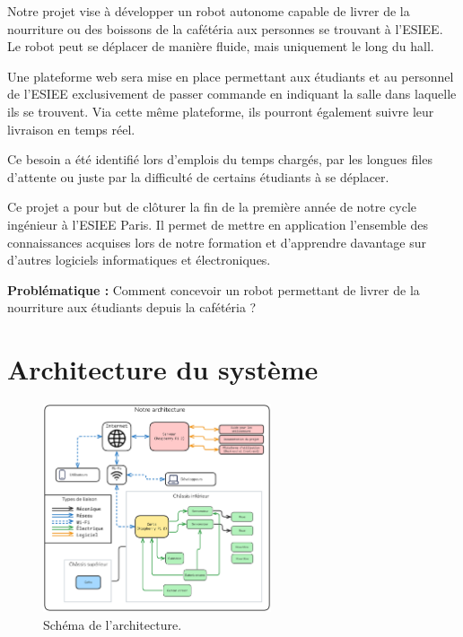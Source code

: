 \documentclass[a4paper,12pt]{report}  %
\begin{document}
Notre projet vise à développer un robot autonome capable de livrer de la
nourriture ou des boissons de la cafétéria aux personnes se trouvant à
l'ESIEE. Le robot peut se déplacer de manière fluide, mais uniquement le
long du hall.

Une plateforme web sera mise en place permettant aux étudiants et au
personnel de l'ESIEE exclusivement de passer commande en indiquant la
salle dans laquelle ils se trouvent. Via cette même plateforme, ils
pourront également suivre leur livraison en temps réel.

Ce besoin a été identifié lors d'emplois du temps
chargés, par les longues files d'attente ou juste par la
difficulté de certains étudiants à se déplacer.

Ce projet a pour but de clôturer la fin de la première année de notre
cycle ingénieur à l'ESIEE Paris. Il permet de mettre en
application l'ensemble des connaissances acquises lors
de notre formation et d'apprendre davantage sur
d'autres logiciels informatiques et électroniques.

\textbf{Problématique :} Comment concevoir un robot permettant
de livrer de la nourriture aux étudiants depuis la cafétéria ?


\section{Architecture du système}

\begin{figure}[H]
	\centering
	\includegraphics[width=0.6\textwidth]{./attachments/arch/2025-06-21-1200_Architecture.pdf}
	\caption{Schéma de l'architecture. }
\end{figure}
\end{document}
